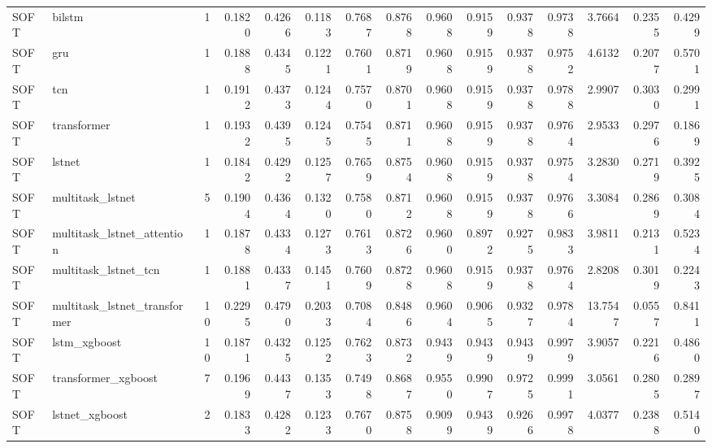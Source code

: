 \begin{tabular}{llrrrrrrrrrrrrr}
SOFT & bilstm & 1 & 0.1820 & 0.4266 & 0.1183 & 0.7687 & 0.8768 & 0.9608 & 0.9159 & 0.9378 & 0.9738 & 3.7664 & 0.2355 & 0.4299 \\
SOFT & gru & 1 & 0.1888 & 0.4345 & 0.1221 & 0.7601 & 0.8719 & 0.9608 & 0.9159 & 0.9378 & 0.9752 & 4.6132 & 0.2077 & 0.5701 \\
SOFT & tcn & 1 & 0.1912 & 0.4373 & 0.1244 & 0.7570 & 0.8701 & 0.9608 & 0.9159 & 0.9378 & 0.9788 & 2.9907 & 0.3030 & 0.2991 \\
SOFT & transformer & 1 & 0.1932 & 0.4395 & 0.1245 & 0.7545 & 0.8711 & 0.9608 & 0.9159 & 0.9378 & 0.9764 & 2.9533 & 0.2976 & 0.1869 \\
SOFT & lstnet & 1 & 0.1842 & 0.4292 & 0.1257 & 0.7659 & 0.8754 & 0.9608 & 0.9159 & 0.9378 & 0.9754 & 3.2830 & 0.2719 & 0.3925 \\
SOFT & multitask_lstnet & 5 & 0.1904 & 0.4364 & 0.1320 & 0.7580 & 0.8712 & 0.9608 & 0.9159 & 0.9378 & 0.9766 & 3.3084 & 0.2869 & 0.3084 \\
SOFT & multitask_lstnet_attention & 1 & 0.1878 & 0.4334 & 0.1273 & 0.7613 & 0.8726 & 0.9600 & 0.8972 & 0.9275 & 0.9833 & 3.9811 & 0.2131 & 0.5234 \\
SOFT & multitask_lstnet_tcn & 1 & 0.1881 & 0.4337 & 0.1451 & 0.7609 & 0.8728 & 0.9608 & 0.9159 & 0.9378 & 0.9764 & 2.8208 & 0.3019 & 0.2243 \\
SOFT & multitask_lstnet_transformer & 10 & 0.2295 & 0.4790 & 0.2033 & 0.7084 & 0.8486 & 0.9604 & 0.9065 & 0.9327 & 0.9784 & 13.7547 & 0.0557 & 0.8411 \\
SOFT & lstm_xgboost & 10 & 0.1871 & 0.4325 & 0.1252 & 0.7623 & 0.8732 & 0.9439 & 0.9439 & 0.9439 & 0.9979 & 3.9057 & 0.2216 & 0.4860 \\
SOFT & transformer_xgboost & 7 & 0.1969 & 0.4437 & 0.1353 & 0.7498 & 0.8687 & 0.9550 & 0.9907 & 0.9725 & 0.9991 & 3.0561 & 0.2805 & 0.2897 \\
SOFT & lstnet_xgboost & 2 & 0.1833 & 0.4282 & 0.1233 & 0.7670 & 0.8758 & 0.9099 & 0.9439 & 0.9266 & 0.9978 & 4.0377 & 0.2388 & 0.5140 \\
\bottomrule
\end{tabular}
